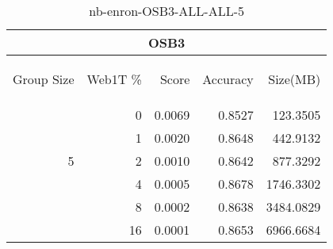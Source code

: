 \begin{center}
\begin{table}[htbp]
\begin{tabular}{ | r | r | r | r | r |}
\hline
\multicolumn{5}{|c|}{OSB3}\\
\hline
\begin{sideways}Group Size\end{sideways} & \begin{sideways}Web1T \%\end{sideways} & \begin{sideways}Score\end{sideways} & \begin{sideways}Accuracy\end{sideways} & \begin{sideways}Size(MB)\end{sideways}\\
\hline
\multirow{5}{*}{5}
 & 0 & 0.0069 & 0.8527 & 123.3505\\ \cline{2-5}
 & 1 & 0.0020 & 0.8648 & 442.9132\\ \cline{2-5}
 & 2 & 0.0010 & 0.8642 & 877.3292\\ \cline{2-5}
 & 4 & 0.0005 & 0.8678 & 1746.3302\\ \cline{2-5}
 & 8 & 0.0002 & 0.8638 & 3484.0829\\ \cline{2-5}
 & 16 & 0.0001 & 0.8653 & 6966.6684\\ \cline{2-5}
\hline
\end{tabular}
\caption{nb-enron-OSB3-ALL-ALL-5}
\label{table:nb-enron-OSB3-ALL-ALL-5}
\end{table}
\end{center}

